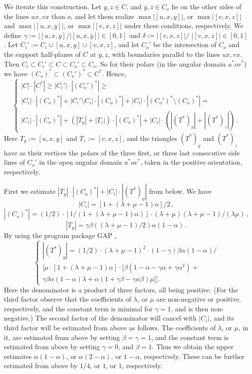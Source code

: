 \documentclass[12pt]{article}
\begin{document}
We iterate this construction. Let $y,z \in C$, and $\overline{y}, \overline{z} 
\in C_o$ lie on the other sides of the
lines $ux,vx$ than $o$, and let them realize $\max |[u,x,y]|$, or 
$\max |[v,x,z]|$ and
$\max |[u,x,\overline{y}]|$, or $\max |[v,x,\overline{z}]|$
under these conditions, respectively. 
We define $\gamma :=|[u,x,y]/|[u,x,\overline{y}]| \in
[0,1]$ and 
$\delta :=|[v,x,z]|/$
\newline
$|[v,x,\overline{z}]| \in [0,1]$. 
Let $C_i':=C_i \cup [u,x,y] \cup [v,x,z]$, and let
$C_o'$ be the intersection of $C_o$ and the support half-planes of $C$ at
$y,z$, with boundaries parallel to the lines $ux,vx$. Then $C_i \subset C_i'
\subset C \subset C_o' \subset C_o$. So for their polars (in the angular
domain $u^*ov^*$) we have $(C_o)^* \subset (C_o')^* \subset C^*$. Hence,
$$
\begin{cases}
|C| \cdot |C^*| \ge |C_i'| \cdot |(C_o')^*| \ge \\ 
|C_i| \cdot |(C_o)^*| +
|C_i' \setminus C_i| \cdot |(C_o)^*| + |C_i| \cdot |(C_o')^* \setminus
(C_o)^*| = \\
|C_i| \cdot |(C_o)^*| + (|T_y|+|T_z|) \cdot |(C_o)^*| +|C_i| \cdot
(|(T^*)_y|+|(T^*)_z|)\,.
\end{cases}
$$
Here $T_y:=[u,x,y]$ and 
$T_z:=[v,x,z]$, and the triangles $(T^*)_y$ and $(T^*)_z$ have
as their vertices the polars of the three first, or three last 
consecutive side lines of $C_o'$ in the open angular domain $u^*ov^*$,
taken in the positive orientation, respectively.

First we estimate $|T_y| \cdot |(C_o)^*| +|C_i| \cdot |(T^*)_y|$ from below.
We have 
$$
|C_i|=[1+(\lambda + \mu -1) \alpha ]/2\,, 
$$
$$
|(C_o)^*|=(1/2) \cdot [1/\left( 1+ (\lambda + \mu -1) \alpha \right) ] \cdot
( \lambda + \mu )( \lambda + \mu -1)/(\lambda \mu )\,,
$$
$$
|T_y|=\gamma \beta \left( (\lambda + \mu -1)/2 \right) \alpha (1- \alpha )\,.
$$
By using the program package GAP \cite{GAP}, 
$$
\begin{cases}
|(T^*)_y|= (1/2) \cdot (\lambda + \mu -1)^2
\cdot (1- \gamma ) \beta \alpha (1- \alpha )/ \\
\bigl[ \mu \cdot [ 1+(\lambda + \mu -1) \alpha ] \cdot 
[  \beta (1 -\alpha -\gamma
\alpha + \gamma  \alpha ^2) +  \\
\gamma \beta \alpha (1-\alpha ) \lambda + 
\alpha (1+ \gamma \beta -\gamma \alpha \beta ) \mu ] \bigr] 
\,.
\end{cases}
$$
Here the 
denominator is a product of three factors, all being positive. (For
the third factor observe that the coefficients of $ \lambda $, or $\mu $ are
non-negative or positive, respectively,
and the constant term is minimal for $ \gamma =1$,
and is then non-negative.) The second factor of the denominator will cancel
with $|C_i|$, 
and its third factor will be estimated from above as follows.
The coefficients of $\lambda $, or $ \mu $, in it, are 
estimated from above by setting $ \beta = \gamma =1$, and the constant term is
estimated from above by setting $\gamma =0$, and $\beta =1$. Thus we obtain
the upper estimates $ \alpha (1 - \alpha )$, or 
$ \alpha ( 2 - \alpha)$, or $1 - \alpha $, 
respectively. These can be further estimated from above by $1/4$, or $1$, or
$1$, respectively. 
\end{document}

